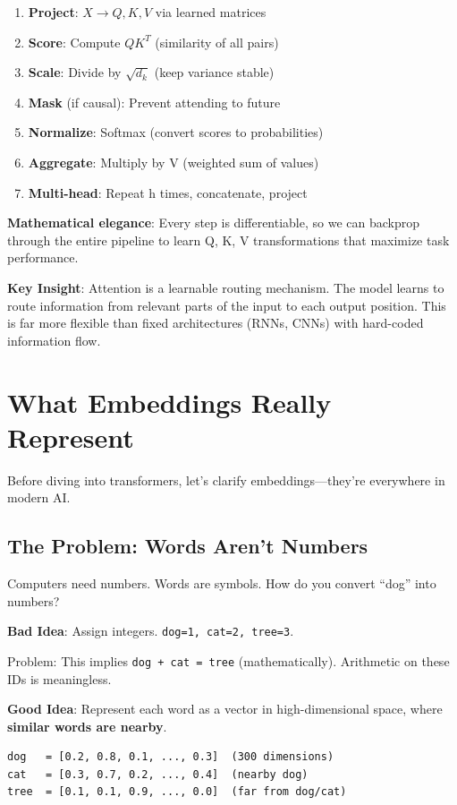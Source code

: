 \documentclass[11pt,oneside]{book}
\begin{document}
\begin{enumerate}
\item \textbf{Project}: $X \to Q, K, V$ via learned matrices
\item \textbf{Score}: Compute $QK^T$ (similarity of all pairs)
\item \textbf{Scale}: Divide by $\sqrt{d_k}$ (keep variance stable)
\item \textbf{Mask} (if causal): Prevent attending to future
\item \textbf{Normalize}: Softmax (convert scores to probabilities)
\item \textbf{Aggregate}: Multiply by V (weighted sum of values)
\item \textbf{Multi-head}: Repeat h times, concatenate, project
\end{enumerate}

\textbf{Mathematical elegance}: Every step is differentiable, so we can backprop through the entire pipeline to learn Q, K, V transformations that maximize task performance.

\textbf{Key Insight}: Attention is a learnable routing mechanism. The model learns to route information from relevant parts of the input to each output position. This is far more flexible than fixed architectures (RNNs, CNNs) with hard-coded information flow.

\section{What Embeddings Really Represent}

Before diving into transformers, let's clarify embeddings---they're everywhere in modern AI.

\subsection{The Problem: Words Aren't Numbers}

Computers need numbers. Words are symbols. How do you convert ``dog'' into numbers?

\textbf{Bad Idea}: Assign integers. \texttt{dog=1, cat=2, tree=3}.

Problem: This implies \texttt{dog + cat = tree} (mathematically). Arithmetic on these IDs is meaningless.

\textbf{Good Idea}: Represent each word as a vector in high-dimensional space, where \textbf{similar words are nearby}.

\begin{verbatim}
dog   = [0.2, 0.8, 0.1, ..., 0.3]  (300 dimensions)
cat   = [0.3, 0.7, 0.2, ..., 0.4]  (nearby dog)
tree  = [0.1, 0.1, 0.9, ..., 0.0]  (far from dog/cat)
\end{verbatim}
\end{document}
